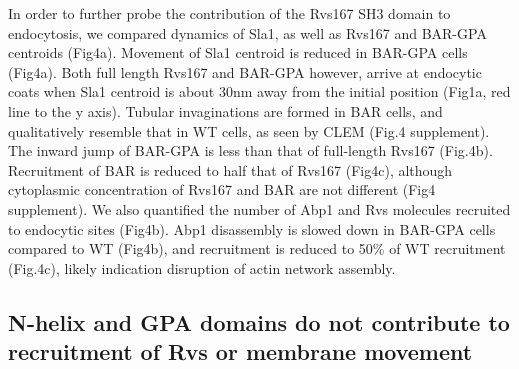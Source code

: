 \documentclass[9pt,lineno]{elife}
\begin{document}
In order to further probe the contribution of the Rvs167 SH3 domain to endocytosis, we compared dynamics of Sla1, as well as Rvs167 and BAR-GPA centroids (Fig4a). Movement of Sla1 centroid is reduced in BAR-GPA cells (Fig4a). Both full length Rvs167 and BAR-GPA however, arrive at endocytic coats when Sla1 centroid is about 30nm away from the initial position (Fig1a, red line to the y axis). Tubular invaginations are formed in BAR cells, and qualitatively resemble that in WT cells, as seen by CLEM (Fig.4 supplement). The inward jump of BAR-GPA is less than that of full-length Rvs167 (Fig.4b). Recruitment of BAR is reduced to half that of Rvs167 (Fig4c), although cytoplasmic concentration of Rvs167 and BAR are not different (Fig4 supplement). We also quantified the number of Abp1 and Rvs molecules recruited to endocytic sites (Fig4b). Abp1 disassembly is slowed down in BAR-GPA cells compared to WT (Fig4b), and recruitment is reduced to 50\% of WT recruitment (Fig.4c), likely indication disruption of actin network assembly. 


\subsection{N-helix and GPA domains do not contribute to recruitment of Rvs or membrane movement}
\lipsum[12]
	
\end{document}
